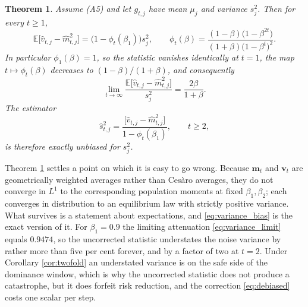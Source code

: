 \documentclass[pdflatex,sn-mathphys-num]{sn-jnl}%
\theoremstyle{thmstyleone}%
\newtheorem{theorem}{Theorem}%
\theoremstyle{thmstyletwo}%
\theoremstyle{thmstylethree}%
\newcommand{\E}{\mathbb{E}}
\begin{document}
\begin{theorem}
\label{thm:variance_bias}
Assume (A5) and let $g_{t,j}$ have mean $\mu_j$ and variance $s^2_j$. Then for every $t\ge1$,
\begin{equation}
\label{eq:variance_bias}
\E\bigl[\hat v_{t,j}-\hat m^2_{t,j}\bigr]=\bigl(1-\phi_t(\beta_1)\bigr)s^2_j,
\qquad
\phi_t(\beta)=\frac{(1-\beta)\bigl(1-\beta^{2t}\bigr)}{(1+\beta)\bigl(1-\beta^{t}\bigr)^{2}} .
\end{equation}
In particular $\phi_1(\beta)=1$, so the statistic vanishes identically at $t=1$, the map $t\mapsto\phi_t(\beta)$ decreases to $(1-\beta)/(1+\beta)$, and consequently
\begin{equation}
\label{eq:variance_limit}
\lim_{t\to\infty}\frac{\E\bigl[\hat v_{t,j}-\hat m^2_{t,j}\bigr]}{s^2_j}=\frac{2\beta}{1+\beta} .
\end{equation}
The estimator
\begin{equation}
\label{eq:debiased}
\hat s^2_{t,j}=\frac{\bigl[\hat v_{t,j}-\hat m^2_{t,j}\bigr]}{1-\phi_t(\beta_1)},
\qquad t\ge2,
\end{equation}
is therefore exactly unbiased for $s^2_j$.
\end{theorem}

Theorem \ref{thm:variance_bias} settles a point on which it is easy to go wrong. Because $\bm m_t$ and $\bm v_t$ are geometrically weighted averages rather than Ces\`aro averages, they do not converge in $L^1$ to the corresponding population moments at fixed $\beta_1,\beta_2$; each converges in distribution to an equilibrium law with strictly positive variance. What survives is a statement about expectations, and \eqref{eq:variance_bias} is the exact version of it. For $\beta_1=0.9$ the limiting attenuation \eqref{eq:variance_limit} equals $0.9474$, so the uncorrected statistic understates the noise variance by rather more than five per cent forever, and by a factor of two at $t=2$. Under Corollary \ref{cor:twofold} an understated variance is on the safe side of the dominance window, which is why the uncorrected statistic does not produce a catastrophe, but it does forfeit risk reduction, and the correction \eqref{eq:debiased} costs one scalar per step.
\end{document}
